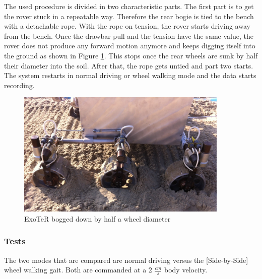 \documentclass[a4paper,twocolumn]{esapub2005} %
\begin{document}
The used procedure is divided in two characteristic parts. The first part is to get the rover stuck in a repeatable way. Therefore the rear bogie is tied to the bench with a detachable rope. With the rope on tension, the rover starts driving away from the bench. Once the drawbar pull and the tension have the same value, the rover does not produce any forward motion anymore and keeps digging itself into the ground as shown in Figure \ref{fig:volleyexoterdigg}. This stops once the rear wheels are sunk by half their diameter into the soil.
After that, the rope gets untied and part two starts. The system restarts in normal driving or wheel walking mode and the data starts recording. 

\begin{figure}[h!]
	\centering		\includegraphics[width=0.9\textwidth]{volleyexoterdigg.JPG}	
	\caption{ExoTeR bogged down by half a wheel diameter}
	\label{fig:volleyexoterdigg}
\end{figure}

\subsubsection{Tests}
The two modes that are compared are normal driving versus the [Side-by-Side] wheel walking gait. Both are commanded at a 2 $\frac{cm}{s}$ body velocity. 
\end{document}
